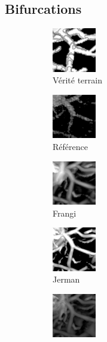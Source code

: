 \subsection{Bifurcations}

\begin{figure}[H]
  \centering
    \centering
      \begin{subfigure}[t]{0.25\textwidth}
        \includegraphics[clip = true, trim  = 0 50 0 80, width=19.0mm]{Images/Ircad_k_GT.png}
        \caption{Vérité terrain}
      \end{subfigure}
      \begin{subfigure}[t]{0.25\textwidth}
        \includegraphics[clip = true, trim  = 0 50 0 80, width=19.0mm]{Images/Ircad_k_Baseline.png}
        \caption{Référence}
      \end{subfigure}
      \begin{subfigure}[t]{0.25\textwidth}
        \includegraphics[clip = true, trim  = 0 50 0 80, width=19.0mm]{Images/Ircad_k_Frangi.png}
        \caption{Frangi}
      \end{subfigure}
      \begin{subfigure}[t]{0.25\textwidth}
        \includegraphics[clip = true, trim  = 0 50 0 80, width=19.0mm]{Images/Ircad_k_Jerman.png}
        \caption{Jerman}
      \end{subfigure}
      \begin{subfigure}[t]{0.25\textwidth}
        \includegraphics[clip = true, trim  = 0 50 0 80, width=19.0mm]{Images/Ircad_k_OOF_GM.png}

\end{subfigure}
\end{figure}
